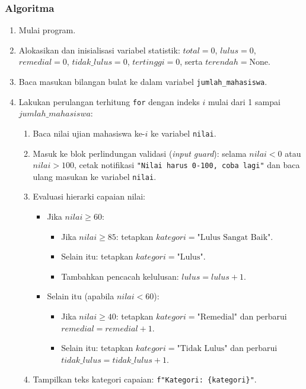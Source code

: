 \documentclass[12pt,a4paper]{article}
\begin{document}
\subsubsection{Algoritma}
\begin{enumerate}
    \item Mulai program.
    \item Alokasikan dan inisialisasi variabel statistik: $total = 0$, $lulus = 0$, $remedial = 0$, $tidak\_lulus = 0$, $tertinggi = 0$, serta $terendah = \text{None}$.
    \item Baca masukan bilangan bulat ke dalam variabel \texttt{jumlah\_mahasiswa}.
    \item Lakukan perulangan terhitung \texttt{for} dengan indeks $i$ mulai dari 1 sampai $jumlah\_mahasiswa$:
    \begin{enumerate}[label=\alph*.]
        \item Baca nilai ujian mahasiswa ke-$i$ ke variabel \texttt{nilai}.
        \item Masuk ke blok perlindungan validasi (\textit{input guard}): selama $nilai < 0$ atau $nilai > 100$, cetak notifikasi \texttt{"Nilai harus 0-100, coba lagi"} dan baca ulang masukan ke variabel \texttt{nilai}.
        \item Evaluasi hierarki capaian nilai:
        \begin{itemize}
            \item Jika $nilai \ge 60$:
            \begin{itemize}
                \item Jika $nilai \ge 85$: tetapkan $kategori = \text{"Lulus Sangat Baik"}$.
                \item Selain itu: tetapkan $kategori = \text{"Lulus"}$.
                \item Tambahkan pencacah kelulusan: $lulus = lulus + 1$.
            \end{itemize}
            \item Selain itu (apabila $nilai < 60$):
            \begin{itemize}
                \item Jika $nilai \ge 40$: tetapkan $kategori = \text{"Remedial"}$ dan perbarui $remedial = remedial + 1$.
                \item Selain itu: tetapkan $kategori = \text{"Tidak Lulus"}$ dan perbarui $tidak\_lulus = tidak\_lulus + 1$.
            \end{itemize}
        \end{itemize}
        \item Tampilkan teks kategori capaian: \texttt{f"Kategori: \{kategori\}"}.

\end{enumerate}
\end{enumerate}
\end{document}
